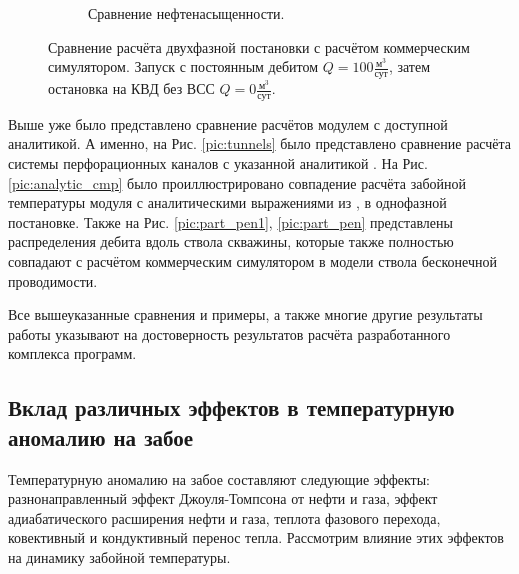 \begin{figure}[H]
\begin{subfigure}[b]{0.5\textwidth}
		\caption{Сравнение нефтенасыщенности.}
		\label{pic:sat_cmp}
	\end{subfigure}
	\caption{Сравнение расчёта двухфазной постановки с расчётом коммерческим симулятором. Запуск с постоянным дебитом $Q=100 \frac{\text{м}^3}{\text{сут}}$, затем остановка на КВД без ВСС $Q=0 \frac{\text{м}^3}{\text{сут}}$.}
	\label{pic:tempest_cmp}
\end{figure}

	Выше уже было представлено сравнение расчётов модулем с доступной аналитикой.
	А именно, на Рис. \ref{pic:tunnels} было представлено сравнение расчёта системы перфорационных каналов с указанной аналитикой \cite{tariq}. На Рис. \ref{pic:analytic_cmp} было проиллюстрировано совпадение расчёта забойной температуры модуля с аналитическими выражениями из \cite{checkalyuk}, \cite{ramazanov_spe} в однофазной постановке.
	Также на Рис. \ref{pic:part_pen1}, \ref{pic:part_pen} представлены распределения дебита вдоль ствола скважины, которые также полностью совпадают с расчётом коммерческим симулятором в модели ствола бесконечной проводимости.

	Все вышеуказанные сравнения и примеры, а также многие другие результаты работы указывают на достоверность результатов расчёта разработанного комплекса программ.

\subsection{Вклад различных эффектов в температурную аномалию на забое}
	
	Температурную аномалию на забое составляют следующие эффекты: разнонаправленный эффект Джоуля-Томпсона от нефти и газа, эффект адиабатического расширения нефти и газа, теплота фазового перехода, ковективный и кондуктивный перенос тепла.	Рассмотрим влияние этих эффектов на динамику забойной температуры.

